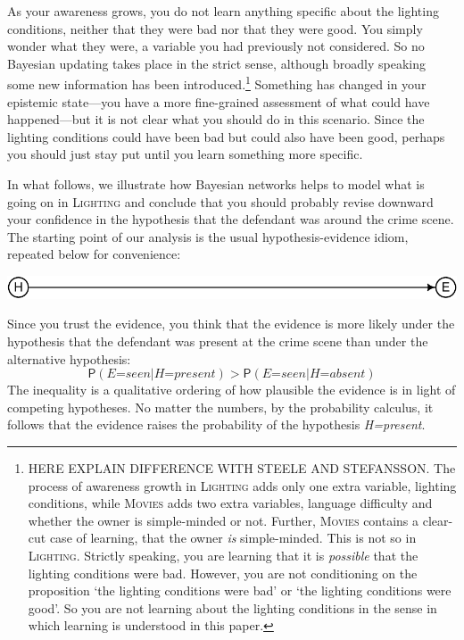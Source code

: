 \documentclass[
  11pt,
  dvipsnames,enabledeprecatedfontcommands]{scrartcl}
\newcommand{\pr}[1]{\ensuremath{\mathsf{P}(#1)}}
\begin{document}
As your awareness grows, you do not learn anything specific about the
lighting conditions, neither that they were bad nor that they were good.
You simply wonder what they were, a variable you had previously not
considered. So no Bayesian updating takes place in the strict sense,
although broadly speaking some new information has been
introduced.\footnote{HERE EXPLAIN DIFFERENCE WITH STEELE AND STEFANSSON.
  The process of awareness growth in \textsc{Lighting} adds only one
  extra variable, lighting conditions, while \textsc{Movies} adds two
  extra variables, language difficulty and whether the owner is
  simple-minded or not. Further, \textsc{Movies} contains a clear-cut
  case of learning, that the owner \emph{is} simple-minded. This is not
  so in \textsc{Lighting}. Strictly speaking, you are learning that it
  is \emph{possible} that the lighting conditions were bad. However, you
  are not conditioning on the proposition `the lighting conditions were
  bad' or `the lighting conditions were good'. So you are not learning
  about the lighting conditions in the sense in which learning is
  understood in this paper.} Something has changed in your epistemic
state---you have a more fine-grained assessment of what could have
happened---but it is not clear what you should do in this scenario.
Since the lighting conditions could have been bad but could also have
been good, perhaps you should just stay put until you learn something
more specific.

In what follows, we illustrate how Bayesian networks helps to model what
is going on in \textsc{Lighting} and conclude that you should probably
revise downward your confidence in the hypothesis that the defendant was
around the crime scene. The starting point of our analysis is the usual
hypothesis-evidence idiom, repeated below for convenience:

\begin{center}\includegraphics[width=0.5\linewidth,height=0.5\textheight]{ReplyToSteeleStefansson5_files/figure-latex/heDAG-1} \end{center}

\noindent Since you trust the evidence, you think that the evidence is
more likely under the hypothesis that the defendant was present at the
crime scene than under the alternative hypothesis:
\[\pr{\textit{E=seen} \vert \textit{H=present}} > \pr{\textit{E=seen} \vert \textit{H=absent}}\]
The inequality is a qualitative ordering of how plausible the evidence
is in light of competing hypotheses. No matter the numbers, by the
probability calculus, it follows that the evidence raises the
probability of the hypothesis \textit{H=present}.
\end{document}
